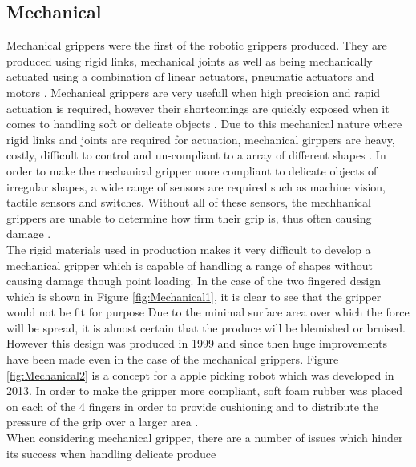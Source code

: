 \documentclass[11pt]{article}
\begin{document}
\subsection{Mechanical}
Mechanical grippers were the first of the robotic grippers produced. They are produced using rigid links, mechanical joints as well as being mechanically actuated using a combination of linear actuators, pneumatic actuators and motors \cite{marchese2015recipe}. Mechanical grippers are very usefull when high precision and rapid actuation is required, however their shortcomings are quickly exposed when it comes to handling soft or delicate objects \cite{ilievski2011soft}. Due to this mechanical nature where rigid links and joints are required for actuation, mechanical girppers are heavy, costly, difficult to control and un-compliant to a array of different shapes \cite{martinez2014soft}. In order to make the mechanical gripper more compliant to delicate objects of irregular shapes, a wide range of sensors are required such as machine vision, tactile sensors and switches. Without all of these sensors, the mechhanical grippers are unable to determine how firm their grip is, thus often causing damage \cite{ceccarelli2000designing}.
\\
\newline
The rigid materials used in production makes it very difficult to develop a mechanical gripper which is capable of handling a range of shapes without causing damage though point loading. In the case of the two fingered design which is shown in Figure \ref{fig:Mechanical1}, it is clear to see that the gripper would not be fit for purpose Due to the minimal surface area over which the force will be spread, it is almost certain that the produce will be blemished or bruised. However this design was produced in 1999 and since then huge improvements have been made even in the case of the mechanical grippers. Figure \ref{fig:Mechanical2} is a concept for a apple picking robot which was developed in 2013. In order to make the gripper more compliant, soft foam rubber was placed on each of the 4 fingers in order to provide cushioning and to distribute the pressure of  the grip over a larger area \cite{chiu2013development}.
\\
\newline
When considering mechanical gripper, there are a number of issues which hinder its success when handling delicate produce 
\end{document}
